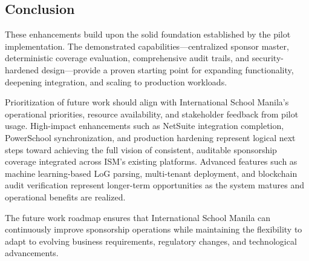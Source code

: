 \subsection{Conclusion}

These enhancements build upon the solid foundation established by the pilot implementation. The demonstrated capabilities—centralized sponsor master, deterministic coverage evaluation, comprehensive audit trails, and security-hardened design—provide a proven starting point for expanding functionality, deepening integration, and scaling to production workloads.

Prioritization of future work should align with International School Manila's operational priorities, resource availability, and stakeholder feedback from pilot usage. High-impact enhancements such as NetSuite integration completion, PowerSchool synchronization, and production hardening represent logical next steps toward achieving the full vision of consistent, auditable sponsorship coverage integrated across ISM's existing platforms. Advanced features such as machine learning-based LoG parsing, multi-tenant deployment, and blockchain audit verification represent longer-term opportunities as the system matures and operational benefits are realized.

The future work roadmap ensures that International School Manila can continuously improve sponsorship operations while maintaining the flexibility to adapt to evolving business requirements, regulatory changes, and technological advancements.